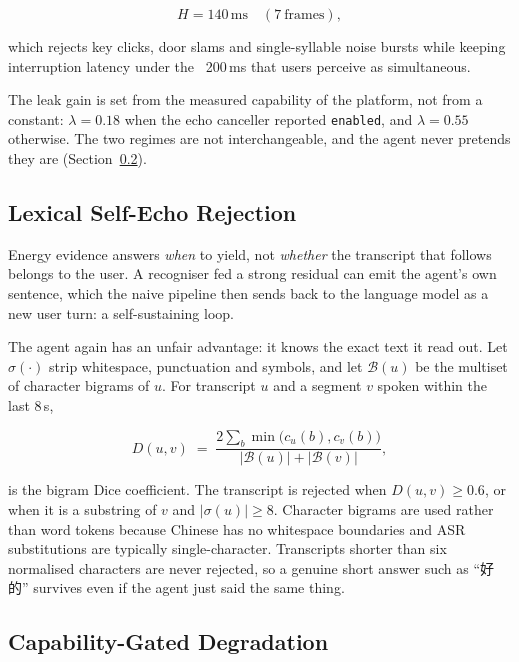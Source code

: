 \begin{equation}
  H = 140\,\text{ms} \quad (7\ \text{frames}),
\end{equation}

which rejects key clicks, door slams and single-syllable noise bursts while
keeping interruption latency under the ~200\,ms that users perceive as
simultaneous.

The leak gain is set from the measured capability of the platform, not from a
constant: $\lambda = 0.18$ when the echo canceller reported
\texttt{enabled}, and $\lambda = 0.55$ otherwise. The two regimes are not
interchangeable, and the agent never pretends they are (Section~\ref{sec:ratt-degrade}).

\subsection{Lexical Self-Echo Rejection}

Energy evidence answers \emph{when} to yield, not \emph{whether} the transcript
that follows belongs to the user. A recogniser fed a strong residual can emit
the agent's own sentence, which the naive pipeline then sends back to the
language model as a new user turn: a self-sustaining loop.

The agent again has an unfair advantage: it knows the exact text it read out.
Let $\sigma(\cdot)$ strip whitespace, punctuation and symbols, and let
$\mathcal{B}(u)$ be the multiset of character bigrams of $u$. For transcript
$u$ and a segment $v$ spoken within the last $8$\,s,

\begin{equation}
  D(u,v) \;=\; \frac{2 \sum_{b} \min\!\big(c_u(b), c_v(b)\big)}
                     {|\mathcal{B}(u)| + |\mathcal{B}(v)|},
  \label{eq:dice}
\end{equation}

is the bigram Dice coefficient. The transcript is rejected when
$D(u,v) \ge 0.6$, or when it is a substring of $v$ and
$|\sigma(u)| \ge 8$. Character bigrams are used rather than word tokens because
Chinese has no whitespace boundaries and ASR substitutions are typically
single-character. Transcripts shorter than six normalised characters are never
rejected, so a genuine short answer such as ``好的'' survives even if the agent
just said the same thing.

\subsection{Capability-Gated Degradation}
\label{sec:ratt-degrade}

